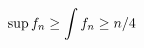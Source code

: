 \documentclass[preview]{standalone}
\begin{document}
\begin{align*}
\special{dvisvgm:raw <g id='unique000'>}\sup f_n\ge\int f_n\ge n/4\special{dvisvgm:raw </g>}
\end{align*}
\end{document}
